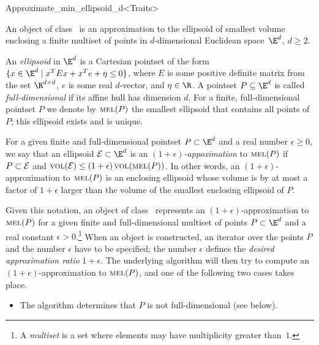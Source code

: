 
\newcommand{\vol}{\ensuremath{\mathop{{\textsc{vol}}}\nolimits}}
\newcommand{\mel}{\ensuremath{\mathop{{\textsc{mel}}}\nolimits}}

\begin{ccRefClass}{Approximate_min_ellipsoid_d<Traits>}


\ccSaveThreeColumns

\ccDefinition

An object of class \ccRefName\ is an approximation to the
ellipsoid of smallest volume enclosing a finite multiset of points
in $d$-dimensional Euclidean space~$\E^d$, $d\ge 2$.

An \emph{ellipsoid} in $\E^d$ is a Cartesian pointset of the form $\{
x\in\E^d \mid x^T E x + x^T e + \eta\leq 0 \}$, where $E$ is some
positive definite matrix from the set $\R^{d\times d}$, $e$ is some
real $d$-vector, and $\eta\in\R$.  A pointset $P\subseteq \E^d$ is
called \emph{full-dimensional} if its affine hull has dimension $d$.
For a finite, full-dimensional pointset $P$ we denote by $\mel(P)$ the
smallest ellipsoid that contains all points of $P$; this ellipsoid
exists and is unique.


For a given finite and full-dimensional pointset $P\subset \E^d$ and a
real number $\epsilon\ge 0$, we say that an ellipsoid ${\cal
E}\subset\E^d$ is an \emph{$(1+\epsilon)$-appoximation} to $\mel(P)$ if
$P\subset {\cal E}$ and $\vol({\cal E}) \leq (1+\epsilon)
\vol(\mel(P))$.  In other words, an $(1+\epsilon)$-approximation to
$\mel(P)$ is an enclosing ellipsoid whose volume is by at most a
factor of $1+\epsilon$ larger than the volume of the smallest
enclosing ellipsoid of $P$.

Given this notation, an object of class \ccRefName\ represents an
$(1+\epsilon)$-approximation to $\mel(P)$ for a given finite and
full-dimensional multiset of points $P\subset\E^d$ and a real constant
$\epsilon>0$.\footnote{A \emph{multiset} is a set where elements may
have multiplicity greater than~$1$.} When an
 object is constructed, an
iterator over the points $P$ and the number $\epsilon$ have to be
specified; the number $\epsilon$ defines the \emph{desired
approximation ratio} $1+\epsilon$.  The underlying algorithm will then
try to compute an $(1+\epsilon)$-approximation to $\mel(P)$, and one of
the following two cases takes place.
\begin{itemize}
\item The algorithm determines that $P$ is not full-dimensional (see
   below).


\end{itemize}
\end{ccRefClass}

